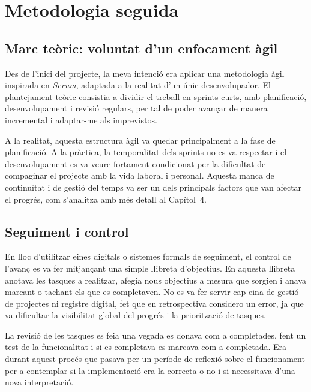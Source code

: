 

\chapter{Metodologia seguida}

\section{Marc teòric: voluntat d'un enfocament àgil}

Des de l'inici del projecte, la meva intenció era aplicar una metodologia àgil inspirada en \emph{Scrum}, adaptada a la realitat d'un únic desenvolupador. El plantejament teòric consistia a dividir el treball en sprints curts, amb planificació, desenvolupament i revisió regulars, per tal de poder avançar de manera incremental i adaptar-me als imprevistos.

A la realitat, aquesta estructura àgil va quedar principalment a la fase de planificació. A la pràctica, la temporalitat dels sprints no es va respectar i el desenvolupament es va veure fortament condicionat per la dificultat de compaginar el projecte amb la vida laboral i personal. Aquesta manca de continuïtat i de gestió del temps va ser un dels principals factors que van afectar el progrés, com s'analitza amb més detall al Capítol~4.

\section{Seguiment i control}

En lloc d'utilitzar eines digitals o sistemes formals de seguiment, el control de l'avanç es va fer mitjançant una simple llibreta d'objectius. En aquesta llibreta anotava les tasques a realitzar, afegia nous objectius a mesura que sorgien i anava marcant o tachant els que es completaven. No es va fer servir cap eina de gestió de projectes ni registre digital, fet que en retrospectiva considero un error, ja que va dificultar la visibilitat global del progrés i la priorització de tasques.

La revisió de les tasques es feia una vegada es donava com a completades, fent un test de la funcionalitat i si es completava es marcava com a completada. Era durant aquest procés que pasava per un període de reflexió sobre el funcionament per a contemplar si la implementació era la correcta o no i si necessitava d'una nova interpretació.

